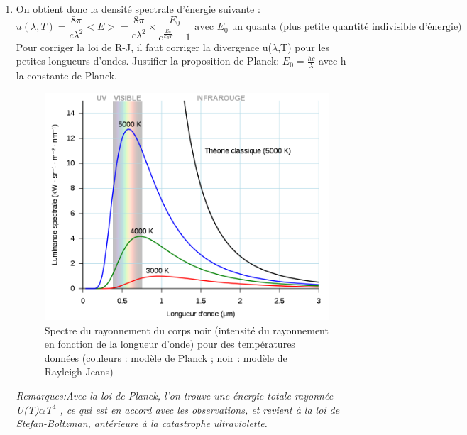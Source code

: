 \documentclass{article}
\begin{document}
\begin{enumerate}
    \item On obtient donc la densité spectrale d'énergie suivante :
    \[ u(\lambda,T) = \frac{8\pi}{c\lambda^{2}}<E> = \frac{8\pi}{c\lambda^{2}} \times \frac{E_{0}}{e^{\frac{E_{0}}{k_{B}T}}-1} \text{ avec $E_{0}$ un quanta (plus petite quantité indivisible d'énergie)} \] 
    Pour corriger la loi de R-J, il faut corriger la divergence u($\lambda$,T) pour les petites longueurs d'ondes.\newline
    Justifier la proposition de Planck: $E_{0} = \frac{hc}{\lambda}$ avec h la constante de Planck.\newline
    \begin{figure}[h]
        \centering
        \includegraphics[scale=0.3]{catastrophe_ultraviolette.png}
        \caption{Spectre du rayonnement du corps noir (intensité du rayonnement en fonction de la longueur d'onde) pour des températures données (couleurs : modèle de Planck ; noir : modèle de Rayleigh-Jeans)}
    \end{figure}

    \indent\textit{Remarques:}\textit{Avec la loi de Planck, l'on trouve une énergie totale rayonnée U(T)$\alpha$T$^{4}$ , ce qui est en accord avec les observations, et revient à la loi de Stefan-Boltzman, antérieure à la catastrophe ultraviolette.}
\end{enumerate}
\end{document}
